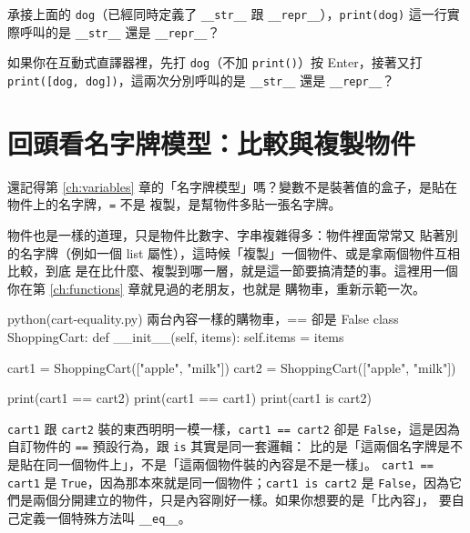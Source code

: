 
\begin{drills}[label=drills:str-vs-repr]
\item 承接上面的 \texttt{dog}（已經同時定義了 \texttt{\_\_str\_\_} 跟
\texttt{\_\_repr\_\_}），\texttt{print(dog)} 這一行實際呼叫的是 \texttt{\_\_str\_\_} 還是
\texttt{\_\_repr\_\_}？
\item 如果你在互動式直譯器裡，先打 \texttt{dog}（不加 \texttt{print()}）按 Enter，接著又打
\texttt{print([dog, dog])}，這兩次分別呼叫的是 \texttt{\_\_str\_\_} 還是
\texttt{\_\_repr\_\_}？
\end{drills}

\section{回頭看名字牌模型：比較與複製物件}
\label{sec:copy-and-equality}

還記得第 \ref{ch:variables} 章的「名字牌模型」嗎？變數不是裝著值的盒子，是貼在物件上的名字牌，\texttt{=} 不是
複製，是幫物件多貼一張名字牌。

物件也是一樣的道理，只是物件比數字、字串複雜得多：物件裡面常常又
貼著別的名字牌（例如一個 list 屬性），這時候「複製」一個物件、或是拿兩個物件互相比較，到底
是在比什麼、複製到哪一層，就是這一節要搞清楚的事。這裡用一個你在第 \ref{ch:functions} 章就見過的老朋友，也就是
購物車，重新示範一次。

\begin{example}{python}{(cart-equality.py) 兩台內容一樣的購物車，== 卻是 False}
class ShoppingCart:
    def __init__(self, items):
        self.items = items


cart1 = ShoppingCart(["apple", "milk"])
cart2 = ShoppingCart(["apple", "milk"])

print(cart1 == cart2)
print(cart1 == cart1)
print(cart1 is cart2)
\end{example}


\texttt{cart1} 跟 \texttt{cart2} 裝的東西明明一模一樣，\texttt{cart1 == cart2} 卻是
\texttt{False}，這是因為自訂物件的 \texttt{==} 預設行為，跟 \texttt{is} 其實是同一套邏輯：
比的是「這兩個名字牌是不是貼在同一個物件上」，不是「這兩個物件裝的內容是不是一樣」。
\texttt{cart1 == cart1} 是 \texttt{True}，因為那本來就是同一個物件；\texttt{cart1 is cart2}
是 \texttt{False}，因為它們是兩個分開建立的物件，只是內容剛好一樣。如果你想要的是「比內容」，
要自己定義一個特殊方法叫 \texttt{\_\_eq\_\_}。

